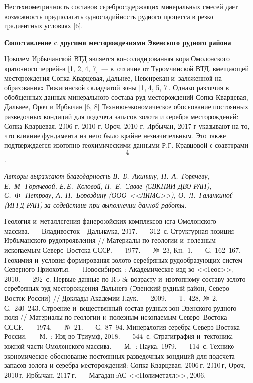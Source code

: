  Нестехиометричность составов серебросодержащих минеральных смесей дает
 возможность предполагать одностадийность рудного процесса в резко
 градиентных условиях [6].

\textbf{Сопоставление c другими месторождениями Эвенского рудного района}

Цоколем Ирбычанской ВТД является консолидированная кора Омолонского кратонного террейна [1, 2, 4, 7]~--- в~отличие от Туромчинской ВТД, вмещающей месторождения Сопка Кварцевая, Дальнее, Невенрекан и~заложенной на образованиях Гижигинской складчатой зоны [1, 4, 5, 7]. Однако различия в обобщенных данных минерального состава руд
месторождений Сопка-Кварцевая, Дальнее, Ороч и Ирбычан [6, 8]
Технико-экономическое обоснование постоянных разведочных кондиций для
подсчета запасов золота и серебра месторождений: Сопка-Кварцевая, 2006
г, 2010 г, Ороч, 2010 г, Ирбычан, 2017 г\] указывают на то, что влияние
фундамента на него было крайне незначительным. Это также подтверждается
изотопно-геохимическими данными Р.Г. Кравцовой с соавторами \[4\].

\textit{Авторы выражают благодарность В.~В.~Акинину,  Н.~А.~Горячеву, Е.~М.~Горячевой, Е.\,Е.~Коловой, Н.~Е.~Савве (СВКНИИ ДВО РАН), С.~Ф.~Петрову, А.~П.~Бороздину (ООО~<<ЛИМС>>), О.~Л.~Галанкиной (ИГГД РАН) за содействие при выполнении данной работы.}


\begin{thebibliography}{99}

\bibitem{}
 Геология и~металлогения фанерозойских комплексов юга Омолонского массива.~--- Владивосток~: Дальнаука, 2017.~--- 312~с.
\bibitem{}
 Структурная позиция Ирбычанского рудопроявления // Материалы по геологии и~полезным ископаемым Северо–Востока СССР.~--- 1977.~--- №~23, Кн.~1.~--- С.~162--167.
\bibitem{}
 Геохимия и~условия формирования золото-серебряных рудообразующих систем Северного Приохотья.~--- Новосибирск~: Академическое изд-во <<Геос>>, 2010.~--- 292~с.
\bibitem{}
 Первые данные по Rb-Sr возрасту и~изотопному составу золото-серебряных руд месторождения Дальнего (Эвенский рудный район, Северо-Восток России) // Доклады Академии Наук.~--- 2009.~--- Т.~428, №~2.~--- С.~240--243.
\bibitem{}
 Строение и~вещественный состав рудных зон Эвенского рудного поля // Материалы по геологии и~полезным ископаемым Северо–Востока СССР.~--- 1974.~--- №~21.~--- С.~87--94.
\bibitem{}
 Минералогия серебра Северо-Востока России.~--- М.~: Изд-во Триумф, 2018.~--- 544~с.
\bibitem{}
 Стратиграфия и~тектоника южной части Омолонского массива.~--- М.~: Наука, 1979.~--- 114~с.
\bibitem{}Технико-экономическое обоснование постоянных разведочных кондиций для подсчета запасов золота и серебра месторождений: Сопка-Кварцевая, 2006\,г, 2010\,г, Ороч, 2010\,г, Ирбычан, 2017\,г.~--- Магадан\,:АО <<Полиметалл>>, 2006.

\end{thebibliography}

